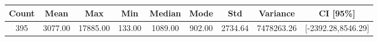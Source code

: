 \begin{tabular}{|c|c|c|c|c|c|c|c|c|}\hline
\rowcolor{Plum!20}
Count&Mean&Max&Min&Median&Mode&Std&Variance&CI [95\%]\\\hline\hline
395&3077.00&17885.00&133.00&1089.00&902.00&2734.64&7478263.26&[-2392.28,8546.29]\\\hline
\end{tabular}
